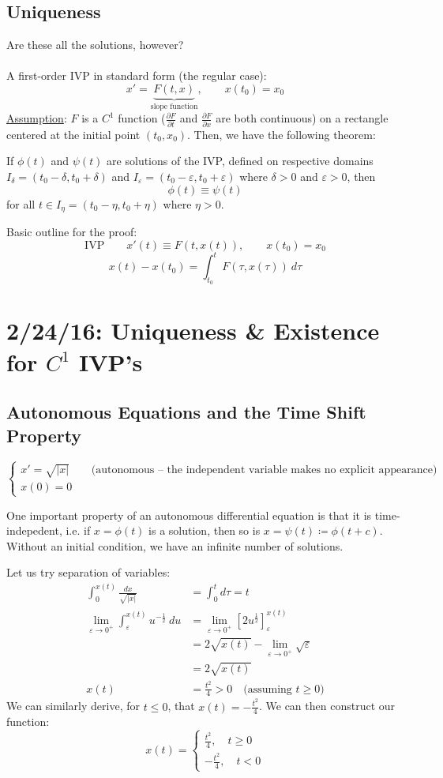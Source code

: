 \documentclass[12pt]{article}
\begin{document}
\subsection{Uniqueness} 
Are these all the solutions, however? \\ \\
A first-order IVP in standard form (the regular case): \[ x' = \underbrace{F(t,x)}_{\text{slope function}}, \qquad x(t_0) = x_0 \]
\underline{Assumption}: $F$ is a $C^1$ function ($\frac{\partial F}{\partial t}$ and $\frac{\partial F}{\partial x}$ are both continuous) on a rectangle centered at the initial point $(t_0,x_0)$. Then, we have the following theorem:
\begin{theorem}
If $\phi(t)$ and $\psi(t)$ are solutions of the IVP, defined on respective domains $I_{\delta} = (t_0 - \delta,t_0 + \delta)$ and $I_{\varepsilon} = (t_0 - \varepsilon,t_0 + \varepsilon)$ where $\delta > 0$ and $\varepsilon > 0$, then \[ \phi(t) \equiv \psi(t) \] for all $t \in I_{\eta} = (t_0 - \eta, t_0 + \eta)$ where $\eta > 0$.
\end{theorem}
Basic outline for the proof: \[ \text{IVP} \qquad x'(t) \equiv F(t,x(t)), \qquad x(t_0) = x_0 \]
\[ x(t) - x(t_0) = \int_{t_0}^t F(\tau,x(\tau)) \ d\tau \]

\section{2/24/16: Uniqueness \& Existence for $C^1$ IVP's}
\subsection{Autonomous Equations and the Time Shift Property}
\[
\begin{cases}
x' = \sqrt{|x|} \qquad \text{(autonomous -- the independent variable makes no explicit appearance)} \\
x(0) = 0
\end{cases}
\]

One important property of an autonomous differential equation is that it is time-indepedent, i.e. if $x = \phi(t)$ is a solution, then so is $x = \psi(t) \coloneqq \phi(t+c)$. Without an initial condition, we have an infinite number of solutions. 

Let us try separation of variables:
\[ 
\begin{aligned}
\int_0^{x(t)} \frac{dx}{\sqrt{|x|}} &= \int_0^t d\tau = t \\
\lim_{\varepsilon \to 0^+}\int_{\varepsilon}^{x(t)} u^{-\frac{1}{2}} \ du &= \lim_{\varepsilon \to 0^+}\left[2u^{\frac{1}{2}}\right]_{\varepsilon}^{x(t)} \\
&= 2\sqrt{x(t)} - \lim_{\varepsilon \to 0^+}{\sqrt{\varepsilon}} \\
&= 2\sqrt{x(t)} \\
x(t) &= \frac{t^2}{4} > 0 \quad \text{(assuming $t \ge 0)$}
\end{aligned}
\]
We can similarly derive, for $t \le 0$, that $x(t) = -\frac{t^2}{4}$. We can then construct our function:
\[ x(t) = 
\begin{cases}
\frac{t^2}{4}, \quad t \ge 0 \\
-\frac{t^2}{4}, \quad t < 0
\end{cases}
\]
\end{document}

